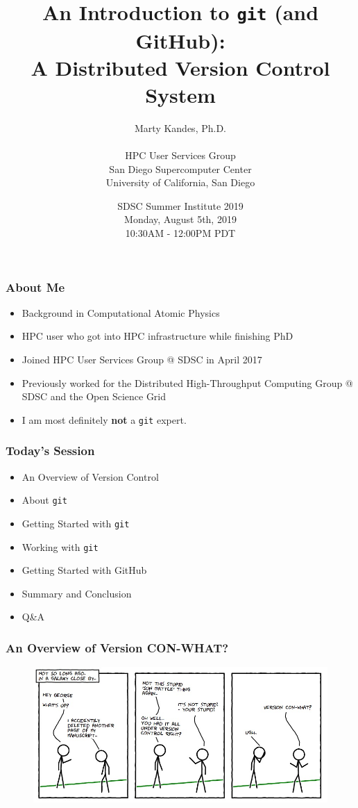 \documentclass{beamer}
\title{An Introduction to \texttt{git} (and GitHub): \\
       \small A Distributed Version Control System}
\author{Marty Kandes, Ph.D. \\ \ \\
 \small HPC User Services Group \\
        San Diego Supercomputer Center \\
        University of California, San Diego}
\date{\small SDSC Summer Institute 2019\\
             Monday, August 5th, 2019 \\
             10:30AM - 12:00PM PDT}
\begin{document}
\maketitle

\begin{frame}
   \frametitle{About Me}
   \begin{itemize}
      \setlength\itemsep{1.0em}
      \item Background in Computational Atomic Physics
      \item HPC user who got into HPC infrastructure while finishing PhD
      \item Joined HPC User Services Group @ SDSC in April 2017
      \item Previously worked for the Distributed High-Throughput 
         Computing Group @ SDSC and the Open Science Grid
      \item I am most definitely \textbf{not} a \texttt{git} expert. 
   \end{itemize}
\end{frame}

\begin{frame}
   \frametitle{Today's Session}
   \begin{itemize}
      \setlength\itemsep{1.0em}
      \item An Overview of Version Control
      \item About \texttt{git}
      \item Getting Started with \texttt{git}
      \item Working with \texttt{git}
      \item Getting Started with GitHub
      \item Summary and Conclusion
      \item Q\&A
   \end{itemize}
\end{frame}

\begin{frame}
   \frametitle{An Overview of Version CON-WHAT?}
   \begin{figure}[htbp]
      \includegraphics[width=1.0\textwidth]{images/version-control-xkcd.jpg}
   \end{figure}
\end{frame}
\end{document}
